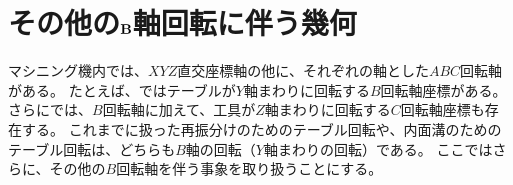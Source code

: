 \chapter[その他の\texorpdfstring{$B$}{B}軸回転に伴う幾何]
         {その他の$\textbf B$軸回転に伴う幾何}
マシニング機内では、$XYZ$直交座標軸の他に、それぞれの軸とした$ABC$回転軸がある。
たとえば、\MMname ではテーブルが$Y$軸まわりに回転する$B$回転軸座標がある。
さらに\DMname では、$B$回転軸に加えて、工具が$Z$軸まわりに回転する$C$回転軸座標も存在する。
これまでに扱った再振分けのためのテーブル回転や、内面溝のためのテーブル回転は、どちらも$B$軸の回転（$Y$軸まわりの回転）である。
ここではさらに、その他の$B$回転軸を伴う事象を取り扱うことにする。



